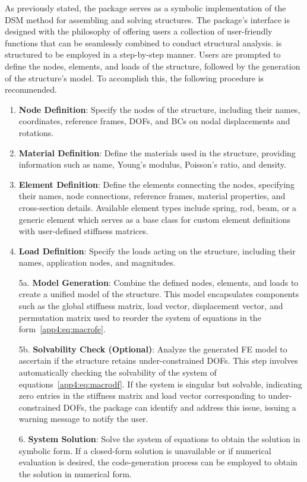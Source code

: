 As previously stated, the \TrussMe{} package serves as a symbolic implementation of the \ac{DSM} method for assembling and solving structures. The package's interface is designed with the philosophy of offering users a collection of user-friendly functions that can be seamlessly combined to conduct structural analysis. \TrussMe{} is structured to be employed in a step-by-step manner. Users are prompted to define the nodes, elements, and loads of the structure, followed by the generation of the structure's model. To accomplish this, the following procedure is recommended.
%
\begin{enumerate}
  \setlength{\itemsep}{0.0em}
  \item \textbf{Node Definition}: Specify the nodes of the structure, including their names, coordinates, reference frames, \acp{DOF}, and \acp{BC} on nodal displacements and rotations.
  \item \textbf{Material Definition}: Define the materials used in the structure, providing information such as name, Young's modulus, Poisson's ratio, and density.
  \item \textbf{Element Definition}: Define the elements connecting the nodes, specifying their names, node connections, reference frames, material properties, and cross-section details. Available element types include spring, rod, beam, or a generic element which serves as a base class for custom element definitions with user-defined stiffness matrices.
  \item \textbf{Load Definition}: Specify the loads acting on the structure, including their names, application nodes, and magnitudes.
  \item[5a.] \textbf{Model Generation}: Combine the defined nodes, elements, and loads to create a unified model of the structure. This model encapsulates components such as the global stiffness matrix, load vector, displacement vector, and permutation matrix used to reorder the system of equations in the form~\eqref{app4:eq:macrofe}.
  \item[5b.] \textbf{Solvability Check (Optional)}: Analyze the generated \ac{FE} model to ascertain if the structure retains under-constrained \acp{DOF}. This step involves automatically checking the solvability of the system of equations~\eqref{app4:eq:macrodf}. If the system is singular but solvable, indicating zero entries in the stiffness matrix and load vector corresponding to under-constrained \acp{DOF}, the \TrussMe{} package can identify and address this issue, issuing a warning message to notify the user.
  \item[6.] \textbf{System Solution}: Solve the system of equations to obtain the solution in symbolic form. If a closed-form solution is unavailable or if numerical evaluation is desired, the code-generation process can be employed to obtain the solution in numerical form.
\end{enumerate}

